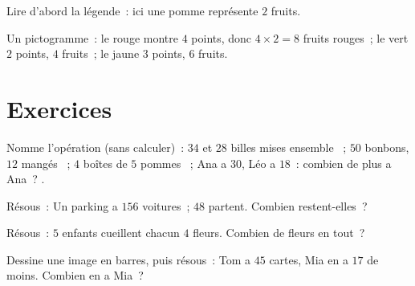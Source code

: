 \begin{example}[Un pictogramme]\label{ex:g2:problems:pictogram}
Lire d'abord la légende~: ici une pomme représente $2$ fruits.

\begin{omfigure}

{\small Un pictogramme~: le rouge montre $4$ points, donc
$4 \times 2 = 8$ fruits rouges~; le vert $2$ points, $4$ fruits~; le
jaune $3$ points, $6$ fruits.}
\end{omfigure}
\end{example}

\section{Exercices}

\begin{exercise}[$\star$]\label{exo:g2:problems:1}
Nomme l'opération (sans calculer)~: \guillemotleft{} $34$ et $28$
billes mises ensemble \guillemotright{}~; \guillemotleft{} $50$
bonbons, $12$ mangés \guillemotright{}~; \guillemotleft{} $4$
boîtes de $5$ pommes \guillemotright{}~; \guillemotleft{} Ana a
$30$, Léo a $18$~: combien de plus a Ana~? \guillemotright{}.
\end{exercise}

\begin{exercise}[$\star$]\label{exo:g2:problems:2}
Résous~: \guillemotleft{} Un parking a $156$ voitures~; $48$
partent. Combien restent-elles~? \guillemotright{}
\end{exercise}

\begin{exercise}[$\star$]\label{exo:g2:problems:3}
Résous~: \guillemotleft{} $5$ enfants cueillent chacun $4$ fleurs.
Combien de fleurs en tout~? \guillemotright{}
\end{exercise}

\begin{exercise}[$\star$]\label{exo:g2:problems:4}
Dessine une image en barres, puis résous~: \guillemotleft{} Tom a
$45$ cartes, Mia en a $17$ de moins. Combien en a Mia~?
\guillemotright{}
\end{exercise}

